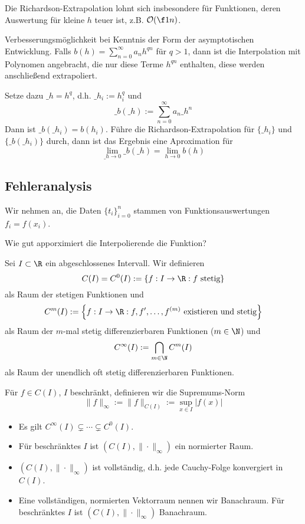 \documentclass[11pt]{scrbook}
\begin{document}
\begin{note}
	Die Richardson-Extrapolation lohnt sich insbesondere für Funktionen, deren Auswertung für kleine $h$ teuer ist, z.B. $\mathcal O(\f 1n)$.
\end{note}

\begin{note}
	Verbesserungsmöglichkeit bei Kenntnis der Form der asymptotischen Entwicklung.
	Falls $b(h) = \sum_{n=0}^\infty a_nh^{qn}$ für $q>1$, dann ist die Interpolation mit Polynomen angebracht, die nur diese Terme $h^{qn}$ enthalten, diese werden anschließend extrapoliert.

	Setze dazu $\_h = h^q$, d.h. $\_{h_{i}}:= h_i^q$ und
	\[
		\_b(\_h) := \sum_{n=0}^\infty a_n\_h^n
	\]
	Dann ist $\_b(\_h_i) = b(h_i)$.
	Führe die Richardson-Extrapolation für $\{\_h_i\}$ und $\{\_b(\_h_i)\}$ durch, dann ist das Ergebnis eine Aproximation für
	\[
		\lim_{\_h\to 0}\_b(\_h) = \lim_{h\to 0}b(h)
	\]
\end{note}

\subsection{Fehleranalysis}

Wir nehmen an, die Daten $\{t_i\}_{i=0}^n$ stammen von Funktionsauswertungen $f_i=f(x_i)$.

Wie gut apporximiert die Interpolierende die Funktion?

\begin{df}
	\label{1.9}
	Sei $I\subset \R$ ein abgeschlossenes Intervall.
	Wir definieren
	\[
		C(I) = C^0(I) := \{f: I\to \R : f \text{ stetig}\}
	\]
	als Raum der stetigen Funktionen und
	\[
		C^m(I) := \Big\{f: I\to \R : f,f',\dotsc,f^{(m)} \text{ existieren und stetig}\Big\}
	\]
	als Raum der $m$-mal stetig differenzierbaren Funktionen ($m\in \N$) und
	\[
		C^\infty(I) := \bigcap_{m\in \N}C^m (I)
	\]
	als Raum der unendlich oft stetig differenzierbaren Funktionen.

	Für $f\in C(I)$, $I$ beschränkt, definieren wir die Supremums-Norm
	\[
		\|f\|_\infty := \|f\|_{C(I)} := \sup_{x\in I}|f(x)|
	\]
\end{df}

\begin{note}
	\begin{itemize}
		\item 
			Es gilt $C^\infty(I) \subsetneq \dotsb \subsetneq C^0(I)$.
		\item
			Für beschränktes $I$ ist $(C(I), \|\cdot\|_\infty)$ ein normierter Raum.
		\item
			$(C(I),\|\cdot\|_\infty)$ ist vollständig, d.h. jede Cauchy-Folge konvergiert in $C(I)$.
		\item
			Eine vollständigen, normierten Vektorraum nennen wir Banachraum.
			Für beschränktes $I$ ist $(C(I),\|\cdot\|_\infty)$ Banachraum.
	\end{itemize}
\end{note}
\end{document}
